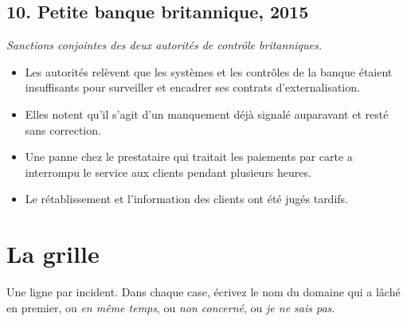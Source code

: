 \documentclass[11pt,a4paper]{article}
\begin{document}
\subsection*{10. Petite banque britannique, 2015}
\textit{Sanctions conjointes des deux autorités de contrôle britanniques.}
\begin{itemize}[itemsep=2pt]
\item Les autorités relèvent que les systèmes et les contrôles de la banque étaient insuffisants
      pour surveiller et encadrer ses contrats d'externalisation.
\item Elles notent qu'il s'agit d'un manquement déjà signalé auparavant et resté sans correction.
\item Une panne chez le prestataire qui traitait les paiements par carte a interrompu le service
      aux clients pendant plusieurs heures.
\item Le rétablissement et l'information des clients ont été jugés tardifs.
\end{itemize}

\newpage
\section*{La grille}

Une ligne par incident. Dans chaque case, écrivez le nom du domaine qui a lâché en premier, ou
\emph{en même temps}, ou \emph{non concerné}, ou \emph{je ne sais pas}.
\end{document}
